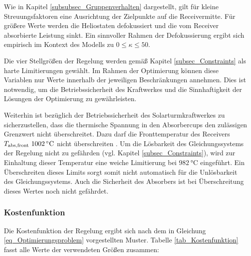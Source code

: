 Wie in Kapitel \ref{subsubsec_Gruppenverhalten} dargestellt, gilt für kleine Streuungsfaktoren eine Ausrichtung der Zielpunkte auf die Receivermitte.
Für größere Werte werden die Heliostaten defokussiert und die vom Receiver absorbierte Leistung sinkt.
Ein sinnvoller Rahmen der Defokussierung ergibt sich empirisch im Kontext des Modells zu $0 \leq \kappa \leq 50$.

Die vier Stellgrößen der Regelung werden gemäß Kapitel \ref{subsec_Constraints} als harte Limitierungen gewählt.
Im Rahmen der Optimierung können diese Variablen nur Werte innerhalb der jeweiligen Beschränkungen annehmen.
Dies ist notwendig, um die Betriebssicherheit des Kraftwerkes und die Sinnhaftigkeit der Lösungen der Optimierung zu gewährleisten.

Weiterhin ist bezüglich der Betriebssicherheit des Solarturmkraftwerkes zu sicherzustellen, dass die thermische Spannung in den Absorbercups den zulässigen Grenzwert nicht überschreitet.
Dazu darf die Fronttemperatur des Receivers $T_{\mathrm{abs,front}}~\SI{1002}{\celsius}$ nicht überschreiten \cite[S.29]{HandbuchJülich}.
Um die Lösbarkeit des Gleichungssystems der Regelung nicht zu gefährden (vgl. Kapitel \ref{subsec_Constraints}), wird zur Einhaltung dieser Temperatur eine weiche Limitierung bei $\SI{982}{\celsius}$ eingeführt.
Ein Überschreiten dieses Limits sorgt somit nicht automatisch für die Unlösbarkeit des Gleichungssystems.
Auch die Sicherheit des Absorbers ist bei Überschreitung dieses Wertes noch nicht gefährdet.

\subsubsection*{Kostenfunktion} \label{subsubsec_Kostenfunktion}
Die Kostenfunktion der Regelung ergibt sich nach dem in Gleichung \ref{eq_Optimierungsproblem} vorgestellten Muster.
Tabelle \ref{tab_Kostenfunktion} fasst alle Werte der verwendeten Größen zusammen:

